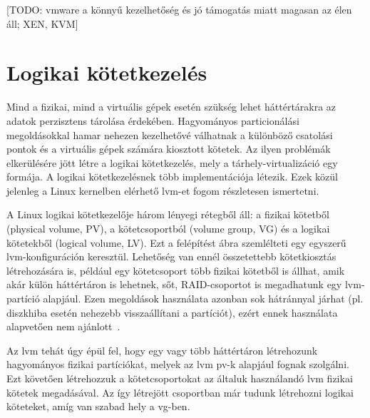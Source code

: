 [TODO: vmware a könnyű kezelhetőség és jó támogatás miatt magasan az élen áll; XEN, KVM]

\section{Logikai kötetkezelés}
Mind a fizikai, mind a virtuális gépek esetén szükség lehet háttértárakra az adatok perzisztens tárolása érdekében. Hagyományos particionálási megoldásokkal hamar nehezen kezelhetővé válhatnak a különböző csatolási pontok és a virtuális gépek számára kiosztott kötetek. Az ilyen problémák elkerülésére jött létre a logikai kötetkezelés, mely a tárhely-virtualizáció egy formája. A logikai kötetkezelésnek több implementációja létezik. %
Ezek közül jelenleg a Linux kernelben elérhető \gls{lvm}-et fogom részletesen ismertetni.

A Linux logikai kötetkezelője három lényegi rétegből áll: a fizikai kötetből (physical volume, PV), a kötetcsoportból (volume group, VG) és a logikai kötetekből (logical volume, LV). Ezt a felépítést  ábra szemlélteti egy egyszerű \gls{lvm}-konfiguráción keresztül.
Lehetőség van ennél összetettebb kötetkiosztás létrehozására is, például egy kötetcsoport több fizikai kötetből is állhat, amik akár külön háttértáron is lehetnek, sőt, RAID-csoportot is megadhatunk egy \gls{lvm}-partíció alapjául. Ezen megoldások használata azonban sok hátránnyal járhat (pl. diszkhiba esetén nehezebb visszaállítani a partíciót), ezért ennek használata alapvetően nem ajánlott~\cite{RHLVM}.

Az \gls{lvm} tehát úgy épül fel, hogy egy vagy több háttértáron létrehozunk hagyományos fizikai partíciókat, melyek az \gls{lvm} \acrshort{pv}-k alapjául fognak szolgálni. Ezt követően létrehozzuk a kötetcsoportokat az általuk használandó \acrshort{lvm} fizikai kötetek megadásával. Az így létrejött csoportban már tudunk létrehozni logikai köteteket, amíg van szabad hely a \acrshort{vg}-ben.

